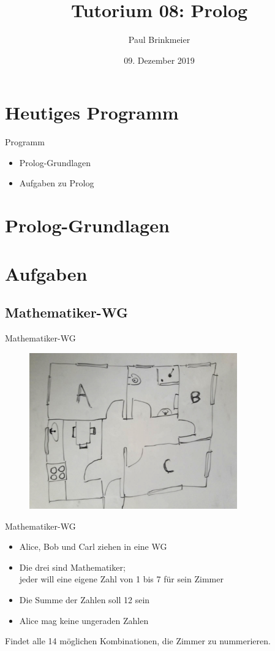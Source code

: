 \documentclass{beamer}
\title{Tutorium 08: Prolog}
\author{Paul Brinkmeier}
\institute{Tutorium Programmierparadigmen am KIT}
\date{09. Dezember 2019}
\begin{document}
\begin{frame}
	\titlepage
\end{frame}

\section{Heutiges Programm}

\begin{frame}{Programm}
	\begin{itemize}
		\item Prolog-Grundlagen
		\item Aufgaben zu Prolog
	\end{itemize}
\end{frame}

\section{Prolog-Grundlagen}

\section{Aufgaben}

\subsection{Mathematiker-WG}

\begin{frame}{Mathematiker-WG}
	\begin{figure}
		\includegraphics[width=0.8\textwidth]{images/mathematiker-wg}
	\end{figure}
\end{frame}

\begin{frame}{Mathematiker-WG}
	\begin{itemize}
		\item Alice, Bob und Carl ziehen in eine WG
		\item Die drei sind Mathematiker;\\jeder will eine eigene Zahl von 1 bis 7 für sein Zimmer
		\item Die Summe der Zahlen soll 12 sein
		\item Alice mag keine ungeraden Zahlen
	\end{itemize}

	Findet alle 14 möglichen Kombinationen, die Zimmer zu nummerieren.
\end{frame}
\end{document}
